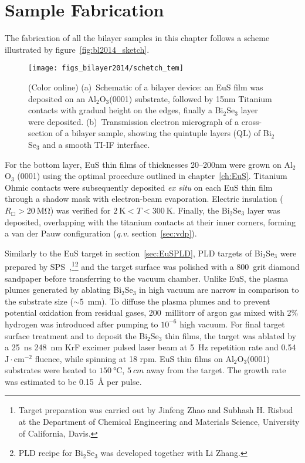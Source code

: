 \section{Sample Fabrication}\label{sec:bilayer2014_char}
The fabrication of all the bilayer samples in this chapter follows a scheme illustrated by figure~\ref{fig:bl2014_sketch}.%
\begin{figure}[h]%
    \centering%
    \subfloat{\label{fig:bl2014_sketch}}%
    \subfloat{\label{fig:bl2014_TEM}}%
    \texttt{[image: figs\_bilayer2014/schetch\_tem]}%
    \caption[Schematic and cross-section TEM of Bi$_2$Se$_3$--EuS thin film bilayers]{(Color online) (a)~Schematic of a bilayer device: an EuS film was deposited on an Al$_2$O$_3$(0001) substrate, followed by 15nm Titanium contacts with gradual height on the edges, finally a Bi$_2$Se$_3$ layer were deposited. (b)~Transmission electron micrograph of a cross-section of a bilayer sample, showing the quintuple layers (QL) of Bi$_2$Se$_3$ and a smooth TI-IF interface.}%
\end{figure} %
%
For the bottom layer, EuS thin films of thicknesses 20--200nm were grown on Al$_2$O$_3$ (0001) using the optimal procedure outlined in chapter~\ref{ch:EuS}. Titanium Ohmic contacts were subsequently deposited \textit{ex situ} on each EuS thin film through a shadow mask with electron-beam evaporation. Electric insulation ($R_\Box > 20~\mathrm{M\Omega}$) was verified for $2~\mathrm{K}<T<300~\mathrm{K}$. Finally, the Bi$_2$Se$_3$ layer was deposited, overlapping with the titanium contacts at their inner corners, forming a van der Pauw configuration (\textit{q.v.} section~\ref{sec:vdp}).

Similarly to the EuS target in section~\ref{sec:EuSPLD}, PLD targets of Bi$_2$Se$_3$ were prepared by SPS~\cite{Jinfeng2, Subhash1},\footnote{Target preparation was carried out by Jinfeng Zhao and Subhash H. Risbud at the Department of Chemical Engineering and Materials Science, University of California, Davis.}\footnote{PLD recipe for Bi$_2$Se$_3$ was developed together with Li Zhang.} and the target surface was polished with a 800~grit diamond sandpaper before transferring to the vacuum chamber. Unlike EuS, the plasma plumes generated by ablating Bi$_2$Se$_3$ in high vacuum are narrow in comparison to the substrate size ($\sim$5~mm). To diffuse the plasma plumes and to prevent potential oxidation from residual gases, 200~millitorr of argon gas mixed with 2\% hydrogen was introduced after pumping to $10^{-6}$ high vacuum. For final target surface treatment and to deposit the Bi$_2$Se$_3$ thin films, the target was ablated by a 25~ns 248~nm KrF excimer pulsed laser beam at 5~Hz repetition rate and 0.54~$\mathrm{J\cdot{}cm^{-2}}$ fluence, while spinning at 18 rpm. EuS thin films on Al$_2$O$_3$(0001) substrates were heated to $\SI{150}{\degreeCelsius}$, $\SI{5}{cm}$ away from the target. The growth rate was estimated to be 0.15~\AA{} per pulse.

